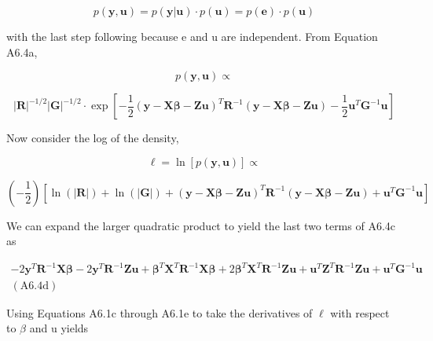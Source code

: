 \documentclass{article}
\begin{document}
\begin{equation}
p(\mathbf{y},\mathbf{u})=p(\mathbf{y}|\mathbf{u})\cdot p(\mathbf{u})=p(\mathbf{e})\cdot p(\mathbf{u})
\end{equation}

with the last step following because e and u are independent. From Equation A6.4a,

\begin{equation}
p(\mathbf{y},\mathbf{u})\propto
\end{equation}

\begin{equation}
\left|\mathbf{R}\right|^{-1/2}\left|\mathbf{G}\right|^{-1/2}\cdot\exp\left[-\frac{1}{2}\left(\mathbf{y}-\mathbf{X}\boldsymbol{\beta}-\mathbf{Z}\mathbf{u}\right)^{T}\mathbf{R}^{-1}\left(\mathbf{y}-\mathbf{X}\boldsymbol{\beta}-\mathbf{Z}\mathbf{u}\right)-\frac{1}{2}\mathbf{u}^{T}\mathbf{G}^{-1}\mathbf{u}\right]
\end{equation}

Now consider the log of the density,

\begin{equation}
\ell=\ln\left[p(\mathbf{y},\mathbf{u})\right]\propto
\end{equation}

\begin{equation}
\left(-\frac{1}{2}\right)\left[\ln(|\mathbf{R}|)+\ln(|\mathbf{G}|)+(\mathbf{y}-\mathbf{X}\boldsymbol{\beta}-\mathbf{Z}\mathbf{u})^{T}\mathbf{R}^{-1}(\mathbf{y}-\mathbf{X}\boldsymbol{\beta}-\mathbf{Z}\mathbf{u})+\mathbf{u}^{T}\mathbf{G}^{-1}\mathbf{u}\right]
\end{equation}

We can expand the larger quadratic product to yield the last two terms of A6.4c as

\begin{equation}
\begin{array}{r}-2\mathbf{y}^{T}\mathbf{R}^{-1}\mathbf{X}\boldsymbol{\beta}-2\mathbf{y}^{T}\mathbf{R}^{-1}\mathbf{Z}\mathbf{u}+\boldsymbol{\beta}^{T}\mathbf{X}^{T}\mathbf{R}^{-1}\mathbf{X}\boldsymbol{\beta}+2\boldsymbol{\beta}^{T}\mathbf{X}^{T}\mathbf{R}^{-1}\mathbf{Z}\mathbf{u}+\mathbf{u}^{T}\mathbf{Z}^{T}\mathbf{R}^{-1}\mathbf{Z}\mathbf{u}+\mathbf{u}^{T}\mathbf{G}^{-1}\mathbf{u}\\ (\mathrm{A6.4d})\end{array}
\end{equation}

Using Equations A6.1c through A6.1e to take the derivatives of  $ \ell $ with respect to  $ \beta $ and u yields
\end{document}
